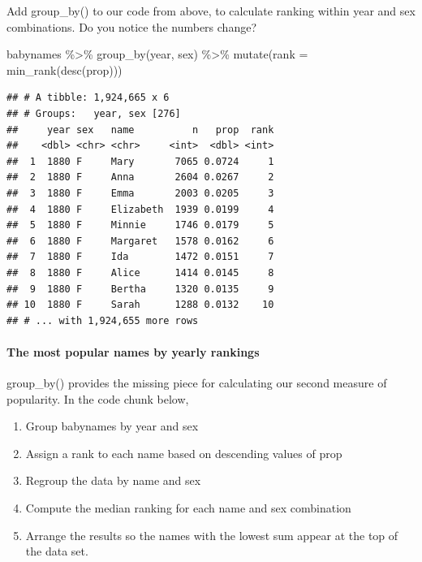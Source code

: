 \documentclass[
]{article}
\newenvironment{Shaded}{\begin{snugshade}}{\end{snugshade}}
\newcommand{\AttributeTok}[1]{\textcolor[rgb]{0.77,0.63,0.00}{#1}}
\newcommand{\FunctionTok}[1]{\textcolor[rgb]{0.00,0.00,0.00}{#1}}
\newcommand{\NormalTok}[1]{#1}
\newcommand{\SpecialCharTok}[1]{\textcolor[rgb]{0.00,0.00,0.00}{#1}}
\providecommand{\tightlist}{%
  \setlength{\itemsep}{0pt}\setlength{\parskip}{0pt}}
\begin{document}
Add group\_by() to our code from above, to calculate ranking within year
and sex combinations. Do you notice the numbers change?

\begin{Shaded}
\begin{Highlighting}[]
\NormalTok{babynames }\SpecialCharTok{\%\textgreater{}\%}
  \FunctionTok{group\_by}\NormalTok{(year, sex) }\SpecialCharTok{\%\textgreater{}\%}
  \FunctionTok{mutate}\NormalTok{(}\AttributeTok{rank =} \FunctionTok{min\_rank}\NormalTok{(}\FunctionTok{desc}\NormalTok{(prop)))}
\end{Highlighting}
\end{Shaded}

\begin{verbatim}
## # A tibble: 1,924,665 x 6
## # Groups:   year, sex [276]
##     year sex   name          n   prop  rank
##    <dbl> <chr> <chr>     <int>  <dbl> <int>
##  1  1880 F     Mary       7065 0.0724     1
##  2  1880 F     Anna       2604 0.0267     2
##  3  1880 F     Emma       2003 0.0205     3
##  4  1880 F     Elizabeth  1939 0.0199     4
##  5  1880 F     Minnie     1746 0.0179     5
##  6  1880 F     Margaret   1578 0.0162     6
##  7  1880 F     Ida        1472 0.0151     7
##  8  1880 F     Alice      1414 0.0145     8
##  9  1880 F     Bertha     1320 0.0135     9
## 10  1880 F     Sarah      1288 0.0132    10
## # ... with 1,924,655 more rows
\end{verbatim}

\hypertarget{the-most-popular-names-by-yearly-rankings}{%
\paragraph{The most popular names by yearly
rankings}\label{the-most-popular-names-by-yearly-rankings}}

group\_by() provides the missing piece for calculating our second
measure of popularity. In the code chunk below,

\begin{enumerate}
\def\labelenumi{\arabic{enumi}.}
\tightlist
\item
  Group babynames by year and sex
\item
  Assign a rank to each name based on descending values of prop
\item
  Regroup the data by name and sex
\item
  Compute the median ranking for each name and sex combination
\item
  Arrange the results so the names with the lowest sum appear at the top
  of the data set.
\end{enumerate}
\end{document}
